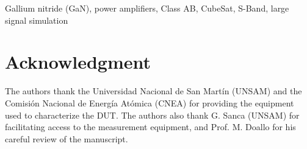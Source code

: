 \documentclass[conference]{IEEEtran}
\begin{document}
\begin{IEEEkeywords}
Gallium nitride (GaN), power amplifiers, Class AB, CubeSat, S-Band, large signal simulation
\end{IEEEkeywords}







\section*{Acknowledgment}
The authors thank the Universidad Nacional de San Martín (UNSAM) and the Comisión Nacional de Energía Atómica (CNEA) for providing the equipment used to characterize the DUT. The authors also thank G. Sanca (UNSAM) for facilitating access to the measurement equipment, and Prof. M. Doallo for his careful review of the manuscript.

\balance



\end{document}
